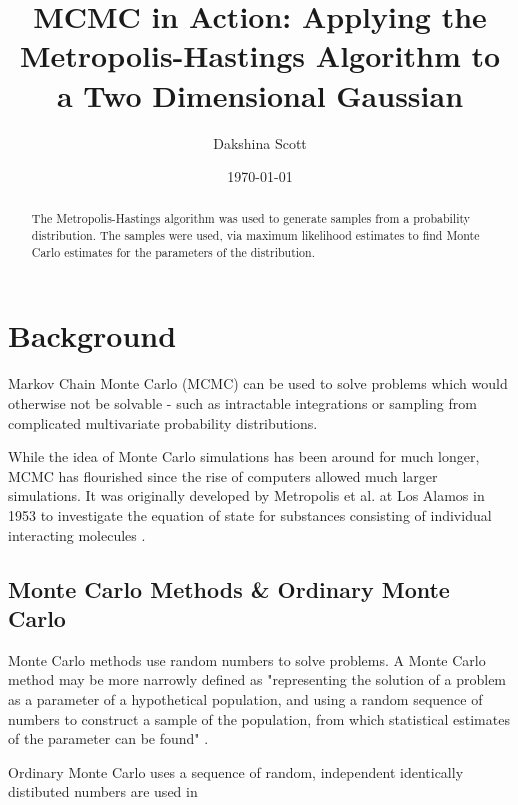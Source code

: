 \documentclass[a4paper,11pt,twoside]{article}
\begin{document}
 
\title{MCMC in Action: Applying the Metropolis-Hastings Algorithm to a Two
Dimensional Gaussian}

\date{\today} 
\author{Dakshina Scott} 
\maketitle

\begin{abstract} 
The Metropolis-Hastings algorithm was used to generate samples from a probability
distribution. The samples were used, via maximum likelihood estimates to
find Monte Carlo estimates for the parameters of the distribution.
\end{abstract}

\tableofcontents

\section{Background} 
Markov Chain Monte Carlo (MCMC) can be used to solve problems which would
otherwise not be solvable - such as intractable integrations or sampling from
complicated multivariate probability distributions.  

While the idea of Monte Carlo simulations has been
around for much longer, MCMC has flourished since the rise of computers allowed
much larger simulations. It was originally developed by Metropolis et al. at Los Alamos in
1953 to investigate the equation of state for substances consisting of
individual interacting molecules \cite{metropolis}.  

\subsection{Monte Carlo Methods \& Ordinary Monte Carlo}
Monte Carlo methods use random numbers to solve problems.  A Monte Carlo method
may be more narrowly defined as
"representing the solution of a problem as a parameter of a hypothetical
population, and using a random sequence of numbers to construct a sample of the
population, from which statistical estimates of the parameter can be found"
\cite{halton}.  

Ordinary Monte Carlo uses a sequence of random, independent identically distibuted
numbers are used in
\end{document}
